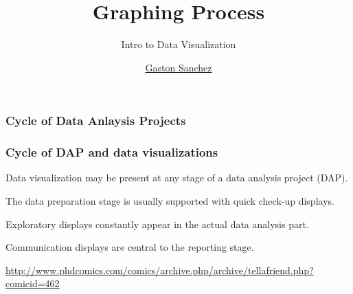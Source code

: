 \documentclass[12pt]{beamer}\usepackage[]{graphicx}\usepackage[]{color}
\title{Graphing Process}
\subtitle{Intro to Data Visualization}
\author{\href{http://www.gastonsanchez.com}{Gaston Sanchez}}
\institute{\href{https://creativecommons.org/licenses/by-sa/4.0/}{\tt \scriptsize \color{foreground} CC BY-SA 4.0}}
\date{}
\begin{document}
{
  \frame{\titlepage} 
}


\begin{frame}
\begin{center}
\Huge{}
\end{center}
\end{frame}


\begin{frame}
\frametitle{Cycle of Data Anlaysis Projects}
\begin{center}
\end{center}
\end{frame}


\begin{frame}
\frametitle{Cycle of DAP and data visualizations}

\bbi
  \item Data visualization may be present at any stage of a data analysis 
project (DAP).
  \item The data preparation stage is usually supported with quick check-up displays.
  \item Exploratory displays constantly appear in the actual data analysis part.
  \item Communication displays are central to the reporting stage.
\ei

\end{frame}


\begin{frame}
\begin{center}
\Huge{}
\end{center}
\end{frame}


\begin{frame}[fragile]
\begin{center}

{\tiny \url{http://www.phdcomics.com/comics/archive.php/archive/tellafriend.php?comicid=462}}
\end{center}
\end{frame}
\end{document}
